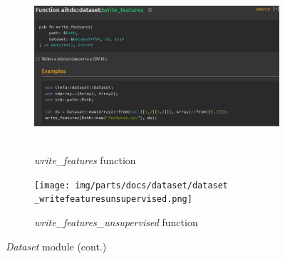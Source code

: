 \begin{figure}
    \ContinuedFloat
    \begin{subfigure}[b]{\linewidth}
        \includegraphics[width = \linewidth]{img/parts/docs/dataset/dataset_writefeatures.png}\
        \caption{\emph{write\_features} function}
        \label{subfig:doc_dataset_writefeatures}
    \end{subfigure}
    \begin{subfigure}[b]{\linewidth}
        \texttt{[image: img/parts/docs/dataset/dataset\\\_writefeaturesunsupervised.png]}
        \caption{\emph{write\_features\_unsupervised} function}
        \label{subfig:doc_dataset_writefeaturesunsupervised}
    \end{subfigure}
    \caption{\emph{Dataset} module (cont.)}
    \label{fig:doc_dataset}
\end{figure}

